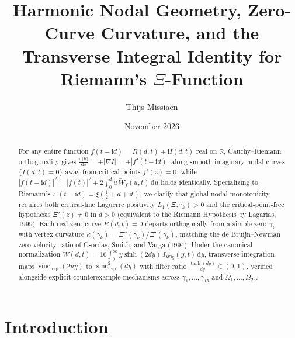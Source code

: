 \documentclass[11pt,a4paper,reqno]{amsart}
\title[Harmonic Nodal Geometry and Transverse Integral Identity for $\Xi$]{Harmonic Nodal Geometry, Zero-Curve Curvature, and the Transverse Integral Identity for Riemann's $\Xi$-Function}
\author{Thijs Missiaen}
\date{November 2026}
\theoremstyle{definition}
\theoremstyle{remark}
\numberwithin{equation}{section}
\newcommand{\dd}{\mathrm{d}}
\newcommand{\ii}{\mathrm{i}}
\newcommand{\Wtil}{\widetilde{W}}
\newcommand{\sinch}{\operatorname{sinc}_{\mathrm{hyp}}}
\begin{document}
\begin{abstract}
For any entire function $f(t-\ii d) = R(d,t) + \ii I(d,t)$ real on $\mathbb{R}$, Cauchy--Riemann orthogonality gives $\frac{\dd|R|}{\dd s} = \pm|\nabla I| = \pm|f'(t-\ii d)|$ along smooth imaginary nodal curves $\{I(d,t) = 0\}$ away from critical points $f'(z) = 0$, while $|f(t-\ii d)|^2 = |f(t)|^2 + 2\int_0^d u\,\Wtil_f(u,t)\,\dd u$ holds identically. Specializing to Riemann's $\Xi(t-\ii d) = \xi(\frac{1}{2}+d+\ii t)$, we clarify that global nodal monotonicity requires both critical-line Laguerre positivity $L_1(\Xi;\tau_k) > 0$ and the critical-point-free hypothesis $\Xi'(z) \neq 0$ in $d > 0$ (equivalent to the Riemann Hypothesis by Lagarias, 1999). Each real zero curve $R(d,t) = 0$ departs orthogonally from a simple zero $\gamma_k$ with vertex curvature $\kappa(\gamma_k) = \Xi''(\gamma_k)/\Xi'(\gamma_k)$, matching the de Bruijn--Newman zero-velocity ratio of Csordas, Smith, and Varga (1994). Under the canonical normalization $W(d,t) = 16\int_0^\infty y\sinh(2d y)\,I_{\mathrm{Wig}}(y,t)\,\dd y$, transverse integration maps $\sinch(2u y)$ to $\sinch^2(d y)$ with filter ratio $\frac{\tanh(d y)}{d y} \in (0,1)$, verified alongside explicit counterexample mechanisms across $\gamma_1,\dots,\gamma_{15}$ and $\Omega_1,\dots,\Omega_{25}$.
\end{abstract}

\maketitle

\section{Introduction}\label{sec:intro}
\end{document}
